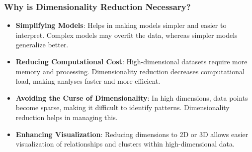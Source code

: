 \documentclass[aspectratio=169]{beamer}
\begin{document}
\begin{frame}[fragile]
    \frametitle{Why is Dimensionality Reduction Necessary?}
    \begin{itemize}
        \item \textbf{Simplifying Models}: Helps in making models simpler and easier to interpret. Complex models may overfit the data, whereas simpler models generalize better.
        \item \textbf{Reducing Computational Cost}: High-dimensional datasets require more memory and processing. Dimensionality reduction decreases computational load, making analyses faster and more efficient.
        \item \textbf{Avoiding the Curse of Dimensionality}: In high dimensions, data points become sparse, making it difficult to identify patterns. Dimensionality reduction helps in managing this.
        \item \textbf{Enhancing Visualization}: Reducing dimensions to 2D or 3D allows easier visualization of relationships and clusters within high-dimensional data.
    \end{itemize}
\end{frame}
\end{document}
